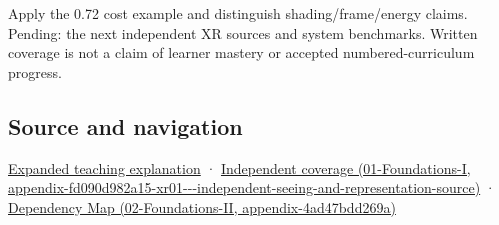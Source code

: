 Apply the 0.72 cost example and distinguish shading/frame/energy claims. Pending: the next independent XR sources and system benchmarks. Written coverage is not a claim of learner mastery or accepted numbered-curriculum progress.

\subsection{Source and navigation}\label{appendix-5878b813b732-source-and-navigation}

\hyperref[04-visual-computing-ii-ch042-foveation-is-allocation-under-uncertain-perception-and-timing]{Expanded teaching explanation} · \href{../01-Foundations-I/main.pdf\#nameddest=appendix-fd090d982a15-xr01---independent-seeing-and-representation-source}{Independent coverage (01-Foundations-I, appendix-fd090d982a15-xr01-\/-\/-independent-seeing-and-representation-source)} · \href{../02-Foundations-II/main.pdf\#nameddest=appendix-4ad47bdd269a}{Dependency Map (02-Foundations-II, appendix-4ad47bdd269a)}
